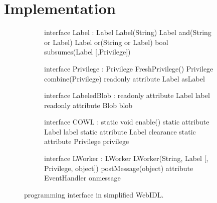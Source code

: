 \section{Implementation}
\label{sec:implementation}

\begin{figure}[t]
  \begin{subfigure}{\columnwidth}
    {\small
    \begin{webidl}
interface Label :
  Label Label(String)
  Label and(String or Label)
  Label or(String or Label)
  bool subsumes(Label [,Privilege])
    \end{webidl}
    \begin{webidl}
interface Privilege :
  Privilege FreshPrivilege()
  Privilege combine(Privilege)
  readonly attribute Label asLabel
    \end{webidl}
    }
    \vspace*{-8pt}
    \label{fig:api:policy} 
    \vspace*{8pt}
  \end{subfigure}
  \begin{subfigure}{\columnwidth}
    {\small
    \begin{webidl}
interface LabeledBlob :
  readonly attribute Label label
  readonly attribute Blob blob
    \end{webidl}
    }
    \vspace*{-8pt}
    \label{fig:api:blob} 
    \vspace*{8pt}
  \end{subfigure}
  \begin{subfigure}{\columnwidth}
    {\small
    \begin{webidl}
interface COWL :
  static void enable()
  static attribute Label label
  static attribute Label clearance 
  static attribute Privilege privilege
    \end{webidl}
    \begin{webidl}
interface LWorker :
  LWorker LWorker(String, Label
                  [, Privilege, object])
  postMessage(object)
  attribute EventHandler onmessage
    \end{webidl}
    }
    \vspace*{-8pt}
    \label{fig:api:compartments}
  \end{subfigure}
  \caption{\sys{} programming interface in simplified WebIDL.}
  \label{fig:api}
\end{figure}

